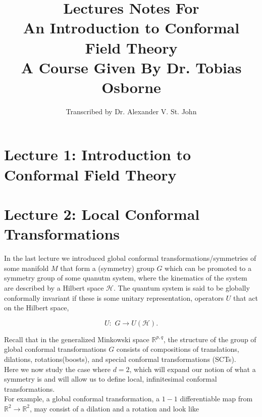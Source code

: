 \documentclass[10pt]{article}
\title{Lectures Notes For \\ An Introduction to Conformal Field Theory \\ A Course Given By Dr. Tobias Osborne}
\author{Transcribed by Dr. Alexander V. St. John}
\begin{document}
\maketitle

\clearpage

\section*{Lecture 1: Introduction to Conformal Field Theory}
\label{sec: lec1}



\clearpage

\section*{Lecture 2: Local Conformal Transformations}
\label{sec: lec2}

\noindent In the last lecture we introduced global conformal transformations/symmetries of some manifold $M$ that form a (symmetry) group $G$ which can be promoted to a symmetry group of some quanutm system, where the kinematics of the system are described by a Hilbert space $\mathcal{H}$. The quantum system is said to be globally conformally invariant if these is some unitary representation, operators $U$ that act on the Hilbert space,

\begin{equation}
U: \,\, G \rightarrow U(\mathcal{H}).
\end{equation}

\noindent Recall that in the generalized Minkowski space $\mathbb{R}^{p,q}$, the structure of the group of global conformal transformations $G$ consists of compositions of translations, dilations, rotations(boosts), and special conformal transformations (SCTs). \\

\noindent Here we now study the case where $d=2$, which will expand our notion of what a symmetry is and will allow us to define local, infinitesimal conformal transformations. \\

\noindent For example, a global conformal transformation, a $1-1$ differentiable map from $\mathbb{R}^2 \rightarrow \mathbb{R}^2$, may consist of a dilation and a rotation and look like

\begin{figure}[H]
	\centering
\end{figure} 
\end{document}
